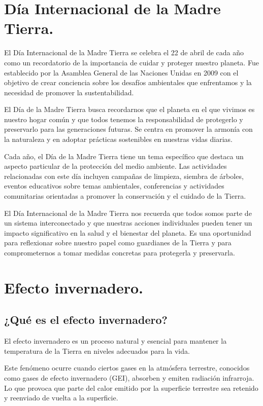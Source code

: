 \documentclass[12pt]{article}
\begin{document}
\section{Día Internacional de la Madre Tierra.}

El Día Internacional de la Madre Tierra se celebra el 22 de abril de cada año como un recordatorio de la importancia de cuidar y proteger nuestro planeta. Fue establecido por la Asamblea General de las Naciones Unidas en 2009 con el objetivo de crear conciencia sobre los desafíos ambientales que enfrentamos y la necesidad de promover la sustentabilidad.

El Día de la Madre Tierra busca recordarnos que el planeta en el que vivimos es nuestro hogar común y que todos tenemos la responsabilidad de protegerlo y preservarlo para las generaciones futuras. Se centra en promover la armonía con la naturaleza y en adoptar prácticas sostenibles en nuestras vidas diarias.

Cada año, el Día de la Madre Tierra tiene un tema específico que destaca un aspecto particular de la protección del medio ambiente. Las actividades relacionadas con este día incluyen campañas de limpieza, siembra de árboles, eventos educativos sobre temas ambientales, conferencias y actividades comunitarias orientadas a promover la conservación y el cuidado de la Tierra.

El Día Internacional de la Madre Tierra nos recuerda que todos somos parte de un sistema interconectado y que nuestras acciones individuales pueden tener un impacto significativo en la salud y el bienestar del planeta. Es una oportunidad para reflexionar sobre nuestro papel como guardianes de la Tierra y para comprometernos a tomar medidas concretas para protegerla y preservarla.

\section{Efecto invernadero.}
\subsection{¿Qué es el efecto invernadero?}

El efecto invernadero es un proceso natural y esencial para mantener la temperatura de la Tierra en niveles adecuados para la vida.

Este fenómeno ocurre cuando ciertos gases en la atmósfera terrestre, conocidos como gases de efecto invernadero (GEI), absorben y emiten radiación infrarroja. Lo que provoca que parte del calor emitido por la superficie terrestre sea retenido y reenviado de vuelta a la superficie.
\end{document}
